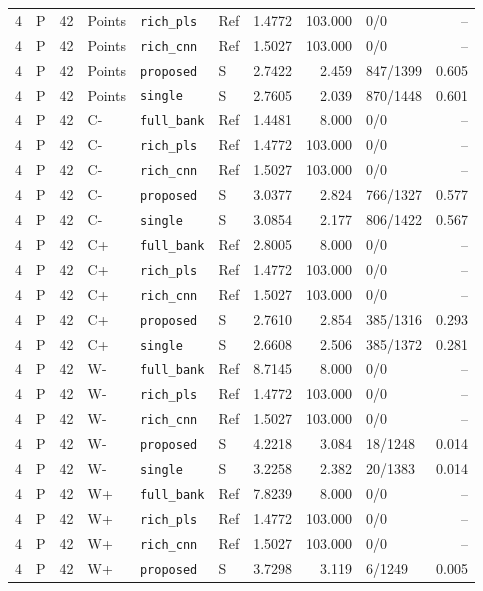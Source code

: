 \documentclass[10pt,a4paper]{article}
\begin{document}
\begin{longtable}{rlrlllrrlr}
4 & P & 42 & Points & \texttt{rich\_pls} & Ref & 1.4772 & 103.000 & 0/0 & -- \\
4 & P & 42 & Points & \texttt{rich\_cnn} & Ref & 1.5027 & 103.000 & 0/0 & -- \\
4 & P & 42 & Points & \texttt{proposed} & S & 2.7422 & 2.459 & 847/1399 & 0.605 \\
4 & P & 42 & Points & \texttt{single} & S & 2.7605 & 2.039 & 870/1448 & 0.601 \\
4 & P & 42 & C- & \texttt{full\_bank} & Ref & 1.4481 & 8.000 & 0/0 & -- \\
4 & P & 42 & C- & \texttt{rich\_pls} & Ref & 1.4772 & 103.000 & 0/0 & -- \\
4 & P & 42 & C- & \texttt{rich\_cnn} & Ref & 1.5027 & 103.000 & 0/0 & -- \\
4 & P & 42 & C- & \texttt{proposed} & S & 3.0377 & 2.824 & 766/1327 & 0.577 \\
4 & P & 42 & C- & \texttt{single} & S & 3.0854 & 2.177 & 806/1422 & 0.567 \\
4 & P & 42 & C+ & \texttt{full\_bank} & Ref & 2.8005 & 8.000 & 0/0 & -- \\
4 & P & 42 & C+ & \texttt{rich\_pls} & Ref & 1.4772 & 103.000 & 0/0 & -- \\
4 & P & 42 & C+ & \texttt{rich\_cnn} & Ref & 1.5027 & 103.000 & 0/0 & -- \\
4 & P & 42 & C+ & \texttt{proposed} & S & 2.7610 & 2.854 & 385/1316 & 0.293 \\
4 & P & 42 & C+ & \texttt{single} & S & 2.6608 & 2.506 & 385/1372 & 0.281 \\
4 & P & 42 & W- & \texttt{full\_bank} & Ref & 8.7145 & 8.000 & 0/0 & -- \\
4 & P & 42 & W- & \texttt{rich\_pls} & Ref & 1.4772 & 103.000 & 0/0 & -- \\
4 & P & 42 & W- & \texttt{rich\_cnn} & Ref & 1.5027 & 103.000 & 0/0 & -- \\
4 & P & 42 & W- & \texttt{proposed} & S & 4.2218 & 3.084 & 18/1248 & 0.014 \\
4 & P & 42 & W- & \texttt{single} & S & 3.2258 & 2.382 & 20/1383 & 0.014 \\
4 & P & 42 & W+ & \texttt{full\_bank} & Ref & 7.8239 & 8.000 & 0/0 & -- \\
4 & P & 42 & W+ & \texttt{rich\_pls} & Ref & 1.4772 & 103.000 & 0/0 & -- \\
4 & P & 42 & W+ & \texttt{rich\_cnn} & Ref & 1.5027 & 103.000 & 0/0 & -- \\
4 & P & 42 & W+ & \texttt{proposed} & S & 3.7298 & 3.119 & 6/1249 & 0.005 \\

\end{longtable}
\end{document}
